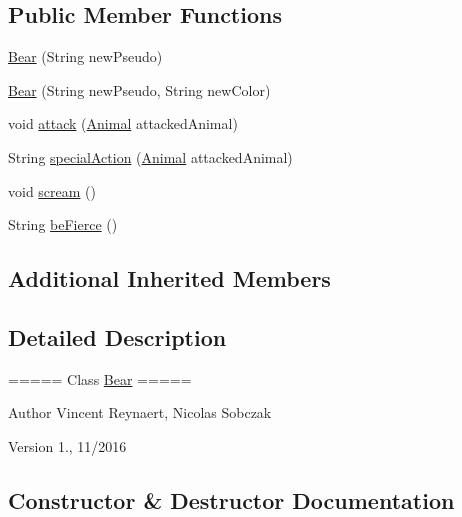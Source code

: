 \subsection*{Public Member Functions}
\begin{DoxyCompactItemize}
\item 
\hyperlink{classanimal_package_1_1_bear_a6d8eb57064fac579568c4527acbb8a0f}{Bear} (String new\+Pseudo)
\item 
\hyperlink{classanimal_package_1_1_bear_ab659fd4a52e58d0f5b2018f0829c3d9b}{Bear} (String new\+Pseudo, String new\+Color)
\item 
void \hyperlink{classanimal_package_1_1_bear_a7c978545964edaa05d2e115cc744ad1a}{attack} (\hyperlink{classanimal_package_1_1_animal}{Animal} attacked\+Animal)
\item 
String \hyperlink{classanimal_package_1_1_bear_ae90f660522aeb791abef80920427a0e7}{special\+Action} (\hyperlink{classanimal_package_1_1_animal}{Animal} attacked\+Animal)
\item 
void \hyperlink{classanimal_package_1_1_bear_a8c4bc708619629006e39b5c220e8341b}{scream} ()
\item 
String \hyperlink{classanimal_package_1_1_bear_adb2490fd33a718dc539bd501485a3764}{be\+Fierce} ()
\end{DoxyCompactItemize}
\subsection*{Additional Inherited Members}


\subsection{Detailed Description}
===== Class \hyperlink{classanimal_package_1_1_bear}{Bear} =====

\begin{DoxyAuthor}{Author}
Vincent Reynaert, Nicolas Sobczak 
\end{DoxyAuthor}
\begin{DoxyVersion}{Version}
1., 11/2016 
\end{DoxyVersion}


\subsection{Constructor \& Destructor Documentation}
